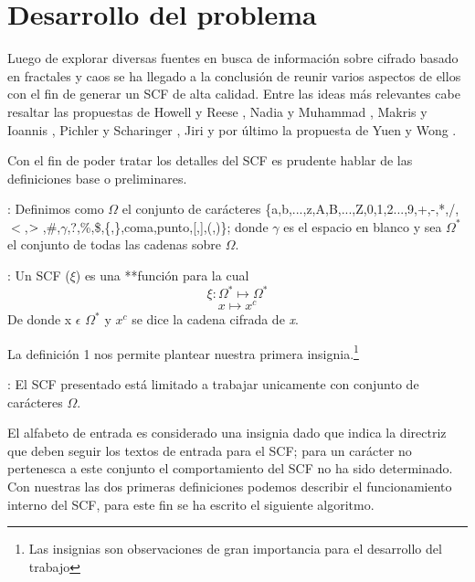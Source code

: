 \section{Desarrollo del problema}

Luego de explorar diversas fuentes en busca de informaci\'on sobre cifrado basado en fractales y caos se ha llegado a la conclusi\'on de reunir varios aspectos de ellos con el fin de generar un SCF de alta calidad. Entre las ideas m\'as relevantes cabe resaltar las propuestas de Howell y Reese \cite{Howell}, Nadia y Muhammad \cite{Nadia2}, Makris y Ioannis \cite{Makris}, Pichler y Scharinger \cite{Pichler}, Jiri \cite{Jiri} y por \'ultimo la propuesta de Yuen y Wong \cite{Yuen}.

Con el fin de poder tratar los detalles del SCF es prudente hablar de las definiciones base o preliminares.

\begin{defi}:
Definimos como $\Omega$ el conjunto de car\'acteres \{a,b,...,z,A,B,...,Z,0,1,2...,9,+,-,*,/,$<$,$>\\$,\#,$\gamma$,?,\%,\$,\{,\},coma,punto,[,],(,)\}; donde $\gamma$ es el espacio en blanco y sea $\Omega^{*}$ el conjunto de todas las cadenas sobre $\Omega$.
\end{defi}

\begin{defi}:
Un SCF ($\xi$) es una **funci\'on para la cual
$$\xi:\Omega^{*} \longmapsto \Omega^{*}$$
$$    x \longmapsto x^{c} $$
De donde x $\epsilon$ $\Omega^{*}$ y $x^{c}$ se dice la cadena cifrada de \emph{x}.
\end{defi}

La definici\'on 1 nos permite plantear nuestra primera insignia.\footnote{Las insignias son observaciones de gran importancia para el desarrollo del trabajo}

\begin{insig} : 
El SCF presentado est\'a limitado a trabajar unicamente con conjunto de car\'acteres $\Omega$.
\end{insig}

El alfabeto de entrada es considerado una insignia dado que indica la directriz que deben seguir los textos de entrada para el SCF; para un car\'acter no pertenesca a este conjunto el comportamiento del SCF no ha sido determinado. Con nuestras las dos primeras definiciones podemos describir el funcionamiento interno del SCF, para este fin se ha escrito el siguiente algoritmo.

